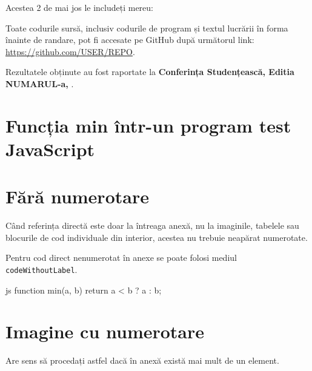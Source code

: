 \documentclass[a4paper,12pt]{report}
\newcommand{\yearOfWriting}{\the\year}
\newcommand{\conferencesList}{Conferința Studențească, Editia NUMARUL-a, \yearOfWriting}
\newcommand{\github}{\url{https://github.com/USER/REPO}}
\begin{document}
Acestea 2 de mai jos le includeți mereu:

Toate codurile sursă, inclusiv codurile de program și textul lucrării
în forma înainte de randare, pot fi accesate pe GitHub după următorul link: \github.

Rezultatele obținute au fost raportate la \textbf{\conferencesList}\cite{self}.

\bibliographyChapter

\appendixChapter

\section{Funcția min într-un program test JavaScript}\label{appendix:example_min}

\section{Fără numerotare}\label{unnumbered_appendix}


Când referința directă este doar la întreaga anexă,
nu la imaginile, tabelele sau blocurile de cod individuale din interior,
acestea nu trebuie neapărat numerotate.


Pentru cod direct nenumerotat în anexe se poate folosi mediul \verb|codeWithoutLabel|.

\begin{codeWithoutLabel}{js}
function min(a, b) {
  return a < b ? a : b;
}
\end{codeWithoutLabel}

\section{Imagine cu numerotare}\label{numbered_appendix}

Are sens să procedați astfel dacă în anexă există mai mult de un element.


\end{document}
